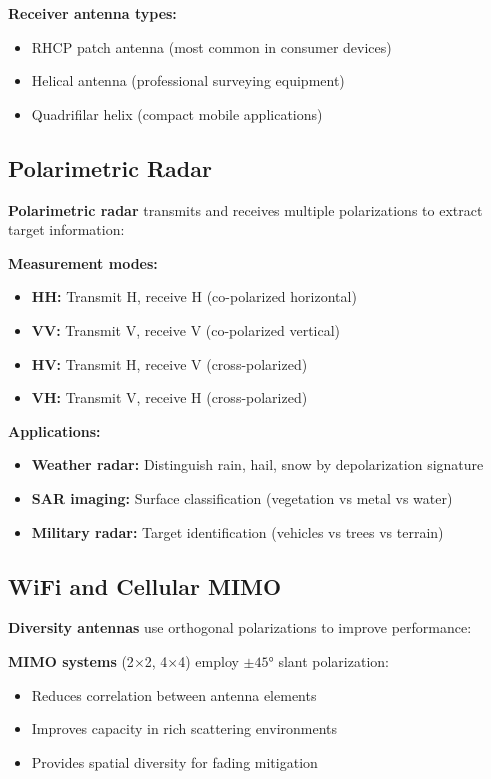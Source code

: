 \begin{center}
\textbf{Receiver antenna types:}
\begin{itemize}
\item RHCP patch antenna (most common in consumer devices)
\item Helical antenna (professional surveying equipment)
\item Quadrifilar helix (compact mobile applications)
\end{itemize}

\subsection{Polarimetric Radar}

\textbf{Polarimetric radar} transmits and receives multiple polarizations to extract target information:

\textbf{Measurement modes:}
\begin{itemize}
\item \textbf{HH:} Transmit H, receive H (co-polarized horizontal)
\item \textbf{VV:} Transmit V, receive V (co-polarized vertical)
\item \textbf{HV:} Transmit H, receive V (cross-polarized)
\item \textbf{VH:} Transmit V, receive H (cross-polarized)
\end{itemize}

\textbf{Applications:}
\begin{itemize}
\item \textbf{Weather radar:} Distinguish rain, hail, snow by depolarization signature
\item \textbf{SAR imaging:} Surface classification (vegetation vs metal vs water)
\item \textbf{Military radar:} Target identification (vehicles vs trees vs terrain)
\end{itemize}

\subsection{WiFi and Cellular MIMO}

\textbf{Diversity antennas} use orthogonal polarizations to improve performance:

\textbf{MIMO systems} (2$\times$2, 4$\times$4) employ $\pm 45°$ slant polarization:
\begin{itemize}
\item Reduces correlation between antenna elements
\item Improves capacity in rich scattering environments
\item Provides spatial diversity for fading mitigation
\end{itemize}


\end{center}
